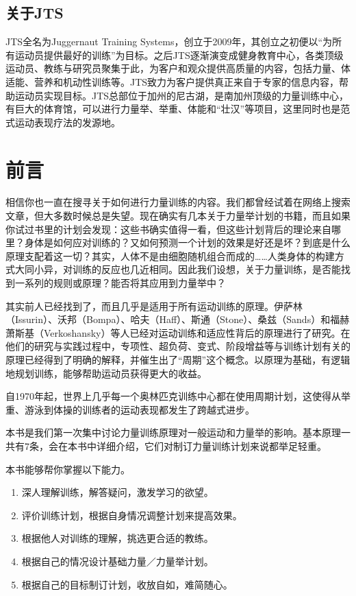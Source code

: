 \documentclass[fontset=fandol, a4paper, 12pt, openright]{ctexbook}
\begin{document}
\section*{关于JTS}
JTS全名为Juggernaut Training Systems，创立于2009年，其创立之初便以“为所有运动员提供最好的训练”为目标。之后JTS逐渐演变成健身教育中心，各类顶级运动员、教练与研究员聚集于此，为客户和观众提供高质量的内容，包括力量、体适能、营养和机动性训练等。JTS致力为客户提供真正来自于专家的信息内容，帮助运动员实现目标。JTS总部位于加州的尼古湖，是南加州顶级的力量训练中心，有巨大的体育馆，可以进行力量举、举重、体能和“壮汉”等项目，这里同时也是范式运动表现疗法的发源地。 

\chapter*{前言}

相信你也一直在搜寻关于如何进行力量训练的内容。我们都曾经试着在网络上搜索文章，但大多数时候总是失望。现在确实有几本关于力量举计划的书籍，而且如果你试过书里的计划会发现：这些书确实值得一看，但这些计划背后的理论来自哪里？身体是如何应对训练的？又如何预测一个计划的效果是好还是坏？到底是什么原理支配着这一切？其实，人体不是由细胞随机组合而成的……人类身体的构建方式大同小异，对训练的反应也几近相同。因此我们设想，关于力量训练，是否能找到一系列的规则或原理？能否将其应用到力量举中？

其实前人已经找到了，而且几乎是适用于所有运动训练的原理。伊萨林（Issurin）、沃邦（Bompa）、哈夫（Haff）、斯通（Stone）、桑兹（Sands）和福赫萧斯基（Verkoshansky）等人已经对运动训练和适应性背后的原理进行了研究。在他们的研究与实践过程中，专项性、超负荷、变式、阶段增益等与训练计划有关的原理已经得到了明确的解释，并催生出了“周期”这个概念。以原理为基础，有逻辑地规划训练，能够帮助运动员获得更大的收益。

自1970年起，世界上几乎每一个奥林匹克训练中心都在使用周期计划，这使得从举重、游泳到体操的训练者的运动表现都发生了跨越式进步。

本书是我们第一次集中讨论力量训练原理对一般运动和力量举的影响。基本原理一共有7条，会在本书中详细介绍，它们对制订力量训练计划来说都举足轻重。

本书能够帮你掌握以下能力。
\begin{enumerate}
\item 深人理解训练，解答疑问，激发学习的欲望。
\item 评价训练计划，根据自身情况调整计划来提高效果。
\item 根据他人对训练的理解，挑选更合适的教练。
\item 根据自己的情况设计基础力量／力量举计划。
\item 根据自己的目标制订计划，收放自如，难简随心。
\end{enumerate}
\end{document}
